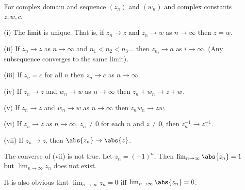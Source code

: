 \begin{lemma}\label{lem:basic_convergence_complex}
For complex domain and sequence $(z_n)$ and $(w_n)$ and complex constants $z,w,c$,
\ben
\item [(i)] The limit is unique. That is, if $z_n \to z$ and $z_n \to w$ as $n \to \infty$ then $z=w$.
\item [(ii)] If $z_n \to z$ as $n \to \infty$ and $n_1 < n_2 < n_3 \ldots$ then $z_{n_i} \to a$ as $i \to \infty$. (Any subsequence converges to the same limit).
\item [(iii)]  If $z_n = c$ for all $n$ then $z_n \to c$ as $n \to \infty$.
\item [(iv)] If $z_n \to z$ and $w_n \to w$ as $n \to \infty$ then $z_n + w_n \to z + w$.
\item [(v)] If $z_n \to z$ and $w_n \to w$ as $n \to \infty$ then $z_n w_n \to zw$.
\item [(vi)] If $z_n \to z$ as $n \to \infty$, $z_n \neq 0$ for each $n$ and $z \neq 0$, then $z_n^{-1} \to  z^{-1}$.
\item [(vii)] If $z_n\to z$, then $\abs{z_n} \to \abs{z}$.
\een
\end{lemma}

\begin{remark}
The converse of (vii) is not true. Let $z_n = (-1)^n$, Then $\lim_{n\to \infty}\abs{z_n}= 1$ but $\lim_{n\to \infty} z_n$ does not exist.

It is also obvious that $\lim_{n\to\infty} z_n = 0$ iff $\lim_{n\to\infty}\abs{z_n} = 0$.
\end{remark}


